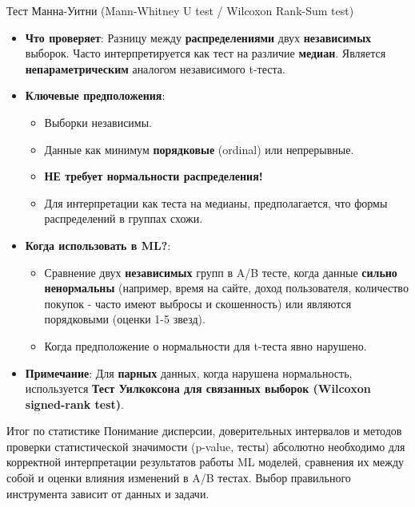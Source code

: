 \begin{myexampleblock}{Тест Манна-Уитни (Mann-Whitney U test / Wilcoxon Rank-Sum test)}
\begin{itemize}
    \item \textbf{Что проверяет}: Разницу между \textbf{распределениями} двух \textbf{независимых} выборок. Часто интерпретируется как тест на различие \textbf{медиан}. Является \textbf{непараметрическим} аналогом независимого t-теста.
    \item \textbf{Ключевые предположения}:
        \begin{itemize}
            \item Выборки независимы.
            \item Данные как минимум \textbf{порядковые} (ordinal) или непрерывные.
            \item \textbf{НЕ требует нормальности распределения!}
            \item Для интерпретации как теста на медианы, предполагается, что формы распределений в группах схожи.
        \end{itemize}
    \item \textbf{Когда использовать в ML?}:
        \begin{itemize}
            \item Сравнение двух \textbf{независимых} групп в A/B тесте, когда данные \textbf{сильно ненормальны} (например, время на сайте, доход пользователя, количество покупок - часто имеют выбросы и скошенность) или являются порядковыми (оценки 1-5 звезд).
            \item Когда предположение о нормальности для t-теста явно нарушено.
        \end{itemize}
    \item \textbf{Примечание}: Для \textbf{парных} данных, когда нарушена нормальность, используется \textbf{Тест Уилкоксона для связанных выборок (Wilcoxon signed-rank test)}.
\end{itemize}
\end{myexampleblock}

\begin{myblock}{Итог по статистике}
Понимание дисперсии, доверительных интервалов и методов проверки статистической значимости (p-value, тесты) абсолютно необходимо для корректной интерпретации результатов работы ML моделей, сравнения их между собой и оценки влияния изменений в A/B тестах. Выбор правильного инструмента зависит от данных и задачи.
\end{myblock}

